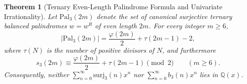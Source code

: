 \documentclass[11pt,a4paper]{article}
\newtheorem{theorem}{Theorem}[section]
\theoremstyle{definition}
\newcommand{\Q}{\mathbb{Q}}
\newcommand{\surj}{\mathrm{surj}}
\newcommand{\Pal}{\mathrm{Pal}}
\begin{document}
\begin{theorem}[Ternary Even-Length Palindrome Formula and Univariate Irrationality]
\label{thm:ternary}
Let $\Pal_3(2m)$ denote the set of canonical surjective ternary balanced palindromes $w = w^R$ of even length $2m$. For every integer $m \ge 6$,
\begin{equation}
\label{eq:pal3}
  |\Pal_3(2m)| = \frac{\varphi(2m)}{2} + \tau(2m - 1) - 2,
\end{equation}
where $\tau(N)$ is the number of positive divisors of $N$, and furthermore
\begin{equation}
\label{eq:s3-mod2}
  s_3(2m) \equiv \frac{\varphi(2m)}{2} + \tau(2m - 1) \pmod 2 \qquad (m \ge 6).
\end{equation}
Consequently, neither $\sum_{n=0}^\infty \surj_3(n)x^n$ nor $\sum_{n=0}^\infty b_3(n)x^n$ lies in $\Q(x)$.
\end{theorem}
\end{document}
